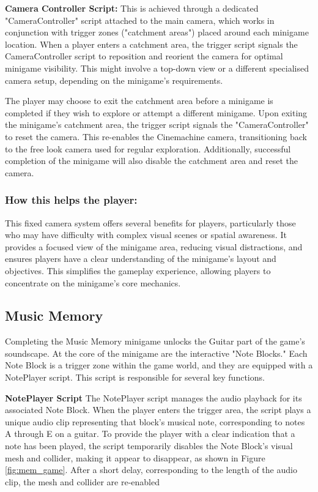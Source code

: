 \documentclass{l4proj}
\begin{document}
\textbf{Camera Controller Script:} \newline
This is achieved through a dedicated "CameraController" script attached to the main camera, which works in conjunction with trigger zones ("catchment areas") placed around each minigame location. When a player enters a catchment area, the trigger script signals the CameraController script to reposition and reorient the camera for optimal minigame visibility. This might involve a top-down view or a different specialised camera setup, depending on the minigame's requirements.

The player may choose to exit the catchment area before a minigame is completed if they wish to explore or attempt a different minigame. Upon exiting the minigame's catchment area, the trigger script signals the "CameraController" to reset the camera. This re-enables the Cinemachine camera, transitioning back to the free look camera used for regular exploration. Additionally, successful completion of the minigame will also disable the catchment area and reset the camera.

    
\subsubsection{How this helps the player:}
This fixed camera system offers several benefits for players, particularly those who may have difficulty with complex visual scenes or spatial awareness. It provides a focused view of the minigame area, reducing visual distractions, and ensures players have a clear understanding of the minigame's layout and objectives. This simplifies the gameplay experience, allowing players to concentrate on the minigame's core mechanics.

\subsection{Music Memory}
Completing the Music Memory minigame unlocks the Guitar part of the game's soundscape. At the core of the minigame are the interactive "Note Blocks." Each Note Block is a trigger zone within the game world, and they are equipped with a NotePlayer script. This script is responsible for several key functions.
\newline

\textbf{NotePlayer Script} \newline
The NotePlayer script manages the audio playback for its associated Note Block. When the player enters the trigger area, the script plays a unique audio clip representing that block's musical note, corresponding to notes A through E on a guitar. To provide the player with a clear indication that a note has been played, the script temporarily disables the Note Block's visual mesh and collider, making it appear to disappear, as shown in Figure \ref{fig:mem_game}. After a short delay, corresponding to the length of the audio clip, the mesh and collider are re-enabled
\end{document}
